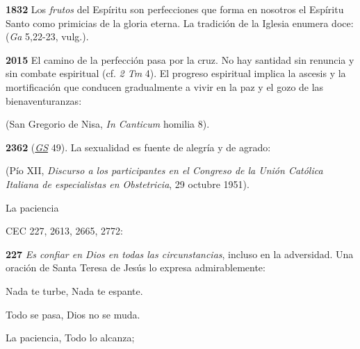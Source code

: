 \textbf{1832} Los \emph{frutos} del Espíritu son perfecciones que forma en nosotros el Espíritu Santo como primicias de la gloria eterna. La tradición de la Iglesia enumera doce:  (\emph{Ga} 5,22-23, vulg.).

\textbf{2015} El camino de la perfección pasa por la cruz. No hay santidad sin renuncia y sin combate espiritual (cf. \emph{2 Tm} 4). El progreso espiritual implica la ascesis y la mortificación que conducen gradualmente a vivir en la paz y el gozo de las bienaventuranzas:

 (San Gregorio de Nisa, \emph{In Canticum} homilia 8).

\textbf{2362}  (\href{http://www.vatican.va/archive/hist_councils/ii_vatican_council/documents/vat-ii_const_19651207_gaudium-et-spes_sp.html}{\emph{GS}} 49). La sexualidad es fuente de alegría y de agrado:

 (Pío XII, \emph{Discurso a los participantes en el Congreso de la Unión Católica Italiana de especialistas en Obstetricia}, 29 octubre 1951).

La paciencia

CEC 227, 2613, 2665, 2772:

\textbf{227} \emph{Es confiar en Dios en todas las circunstancias}, incluso en la adversidad. Una oración de Santa Teresa de Jesús lo expresa admirablemente:

Nada te turbe, Nada te espante.

Todo se pasa, Dios no se muda.

La paciencia, Todo lo alcanza;

